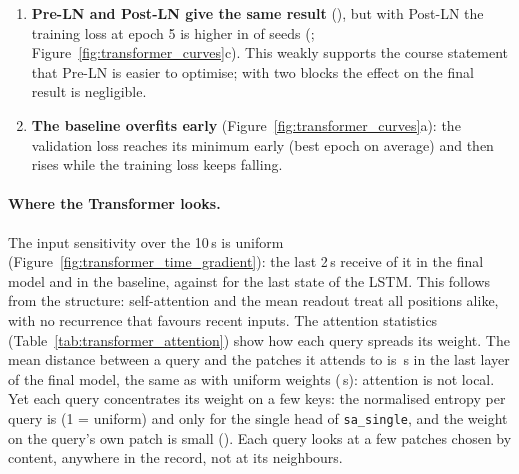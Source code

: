 \begin{enumerate}[leftmargin=1.4em,itemsep=2pt]
        \transformerNSeedsWorsePatchFiveZero{} seeds), patches of 25 by \transformerDiffMeanPatchTwoFive{},
        and patches of 5 (\transformerTokensPatchFive{} tokens) by \transformerDiffMeanPatchFive{}, not
        significant in any seed, at twice the time per epoch. The explanation I propose is the same as for
        the RNN frames, and also a hypothesis: a patch is flattened by one linear layer, so a QRS is seen
        by different weights depending on where it falls inside the patch; shorter patches reduce this.
  \item \textbf{Pre-LN and Post-LN give the same result} (\transformerDiffMeanPostLn{}), but with Post-LN
        the training loss at epoch 5 is higher in \transformerNSeedsTrainLossHigherPostLn{} of
        \transformerNSeedsComparedPostLn{} seeds (\transformerTrainLossEpFiveDiffMeanPostLn{};
        Figure~\ref{fig:transformer_curves}c). This weakly supports the course statement that Pre-LN is
        easier to optimise; with two blocks the effect on the final result is negligible.
  \item \textbf{The baseline overfits early} (Figure~\ref{fig:transformer_curves}a): the validation loss
        reaches its minimum early (best epoch \onedec{\transformerBestEpochMeanBase} on average) and then
        rises while the training loss keeps falling.
\end{enumerate}



\paragraph{Where the Transformer looks.} The input sensitivity over the 10\,s is uniform
(Figure~\ref{fig:transformer_time_gradient}): the last 2\,s receive \transformerSensLastNoPos{} of it in
the final model and \transformerSensLastBase{} in the baseline, against \rnnSensLastBase{} for the last
state of the LSTM. This follows from the structure: self-attention and the mean readout treat all
positions alike, with no recurrence that favours recent inputs. The attention statistics
(Table~\ref{tab:transformer_attention}) show how each query spreads its weight. The mean distance between
a query and the patches it attends to is \transformerAttnDistLastNoPos\,s in the last layer of the final
model, the same as with uniform weights (\transformerAttnDistUniformNoPos\,s): attention is not local.
Yet each query concentrates its weight on a few keys: the normalised entropy per query is
\transformerAttnQentropyLastNoPos{} (1 = uniform) and only \transformerAttnQentropyFirstSaSingle{} for the
single head of \texttt{sa\_single}, and the weight on the query's own patch is small
(\transformerAttnDiagLastNoPos{}). Each query looks at a few patches chosen by content, anywhere in the
record, not at its neighbours.

